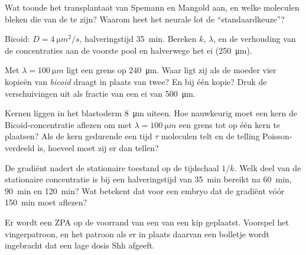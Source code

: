 \begin{exercise}[$\star$]\label{exo:b3:developmental-genetics:4}
Wat toonde het transplantaat van Spemann en Mangold aan, en welke
moleculen bleken die van de  te zijn? Waarom heet het
neurale lot de ``standaardkeuze''?
\end{exercise}

\begin{exercise}[$\star\star$]\label{exo:b3:developmental-genetics:5}
Bicoid: $D = \qty{4}{\micro m^2/s}$, halveringstijd \qty{35}{min}.
Bereken $k$, $\lambda$, en de verhouding van de concentraties aan de
voorste pool en halverwege het ei (\qty{250}{\micro m}).
\end{exercise}

\begin{exercise}[$\star\star$]\label{exo:b3:developmental-genetics:6}
Met $\lambda = \qty{100}{\micro m}$ ligt een grens op
\qty{240}{\micro m}. Waar ligt zij als de moeder vier kopieën van
\emph{bicoid} draagt in plaats van twee? En bij één kopie? Druk de
verschuivingen uit als fractie van een ei van \qty{500}{\micro m}.
\end{exercise}

\begin{exercise}[$\star\star$]\label{exo:b3:developmental-genetics:7}
Kernen liggen in het blastoderm \qty{8}{\micro m} uiteen. Hoe
nauwkeurig moet een kern de Bicoid-concentratie aflezen om met
$\lambda = \qty{100}{\micro m}$ een grens tot op één kern te plaatsen?
Als de kern gedurende een tijd $\tau$ moleculen telt en de telling
Poisson-verdeeld is, hoeveel moet zij er dan tellen?
\end{exercise}

\begin{exercise}[$\star\star$]\label{exo:b3:developmental-genetics:8}
De gradiënt nadert de stationaire toestand op de tijdschaal $1/k$. Welk
deel van de stationaire concentratie is bij een halveringstijd van
\qty{35}{min} bereikt na \qty{60}{min}, \qty{90}{min} en
\qty{120}{min}? Wat betekent dat voor een embryo dat de gradiënt vóór
\qty{150}{min} moet aflezen?
\end{exercise}

\begin{exercise}[$\star\star$]\label{exo:b3:developmental-genetics:9}
Er wordt een ZPA op de voorrand van een  van een kip
geplaatst. Voorspel het vingerpatroon, en het patroon als er in plaats
daarvan een bolletje wordt ingebracht dat een lage dosis Shh afgeeft.
\end{exercise}

